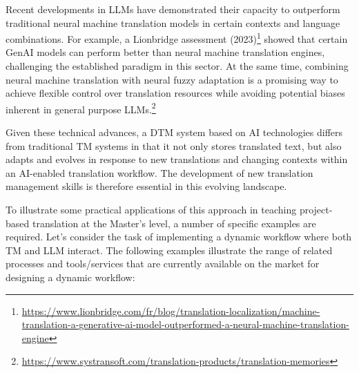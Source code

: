\documentclass[output=paper]{langscibook}
\begin{document}
Recent developments in LLMs have demonstrated their capacity to outperform traditional neural machine translation models in certain contexts and language combinations. For example, a Lionbridge assessment (2023)\footnote{\url{https://www.lionbridge.com/fr/blog/translation-localization/machine-translation-a-generative-ai-model-outperformed-a-neural-machine-translation-engine}} showed that certain GenAI models can perform better than neural machine translation engines, challenging the established paradigm in this sector. At the same time, combining neural machine translation with neural fuzzy adaptation is a promising way to achieve flexible control over translation resources while avoiding potential biases inherent in general purpose LLMs.\footnote{\url{https://www.systransoft.com/translation-products/translation-memories}}

Given these technical advances, a DTM system based on AI technologies differs from traditional TM systems in that it not only stores translated text, but also adapts and evolves in response to new translations and changing contexts within an AI-enabled translation workflow. The development of new translation management skills is therefore essential in this evolving landscape.

To illustrate some practical applications of this approach in teaching project-based translation at the Master’s level, a number of specific examples are required. Let’s consider the task of implementing a dynamic workflow where both TM and LLM interact. The following examples illustrate the range of related processes and tools/services that are currently available on the market for designing a dynamic workflow:
\end{document}
